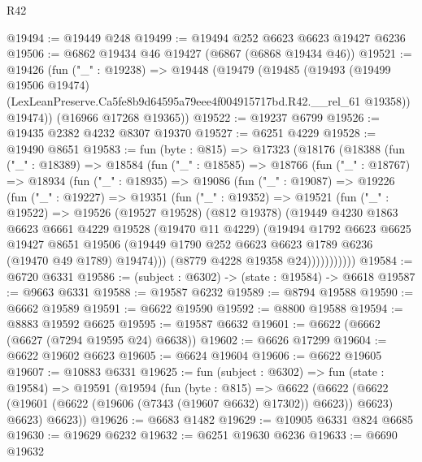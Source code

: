 \begin{lexlean}{R42}
\begin{coremodule}
{@19494 := @19449 @248
@19499 := @19494 @252 @6623 @6623 @19427 @6236
@19506 := @6862 @19434 @46 @19427 (@6867 (@6868 @19434 @46))
@19521 := @19426
    (fun ("_" : @19238) =>
    @19448
      (@19479
        (@19485
          (@19493
            (@19499 @19506 @19474)
            (LexLeanPreserve.Ca5fe8b9d64595a79eee4f004915717bd.R42.__rel_61 @19358))
          @19474))
      (@16966 @17268 @19365))
@19522 := @19237 @6799
@19526 := @19435 @2382 @4232 @8307 @19370
@19527 := @6251 @4229
@19528 := @19490 @8651
@19583 := fun (byte : @815) =>
  @17323
    (@18176
      (@18388
        (fun ("_" : @18389) =>
        @18584
          (fun ("_" : @18585) =>
          @18766
            (fun ("_" : @18767) =>
            @18934
              (fun ("_" : @18935) =>
              @19086
                (fun ("_" : @19087) =>
                @19226
                  (fun ("_" : @19227) =>
                  @19351
                    (fun ("_" : @19352) =>
                    @19521
                      (fun ("_" : @19522) =>
                      @19526
                        (@19527 @19528)
                        (@812 @19378)
                        (@19449
                          @4230
                          @1863
                          @6623
                          @6661
                          @4229
                          @19528
                          (@19470 @11 @4229)
                          (@19494
                            @1792
                            @6623
                            @6625
                            @19427
                            @8651
                            @19506
                            (@19449 @1790 @252 @6623 @6623 @1789 @6236 (@19470 @49 @1789) @19474)))
                        (@8779 @4228 @19358 @24)))))))))))
@19584 := @6720 @6331
@19586 := (subject : @6302) -> (state : @19584) -> @6618
@19587 := @9663 @6331
@19588 := @19587 @6232
@19589 := @8794 @19588
@19590 := @6662 @19589
@19591 := @6622 @19590
@19592 := @8800 @19588
@19594 := @8883 @19592 @6625
@19595 := @19587 @6632
@19601 := @6622 (@6662 (@6627 (@7294 @19595 @24) @6638))
@19602 := @6626 @17299
@19604 := @6622 @19602 @6623
@19605 := @6624 @19604
@19606 := @6622 @19605
@19607 := @10883 @6331
@19625 := fun (subject : @6302) =>
  fun (state : @19584) =>
  @19591
    (@19594
      (fun (byte : @815) =>
      @6622
        (@6622 (@6622 (@19601 (@6622 (@19606 (@7343 (@19607 @6632) @17302)) @6623)) @6623) @6623)
        @6623))
@19626 := @6683 @1482
@19629 := @10905 @6331 @824 @6685
@19630 := @19629 @6232
@19632 := @6251 @19630 @6236
@19633 := @6690 @19632
}
\end{coremodule}
\end{lexlean}
